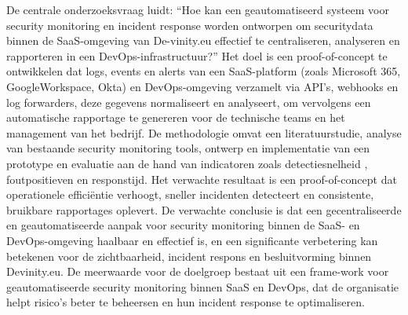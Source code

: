 \documentclass[dutch,dit,thesis]{hogentreport}
\begin{document}
De centrale onderzoeksvraag luidt: “Hoe kan een geautomatiseerd systeem voor security monitoring en incident response worden ontworpen om securitydata binnen de SaaS-omgeving van De-vinity.eu effectief te centraliseren, analyseren en rapporteren in een DevOps-infrastructuur?” Het doel is een proof-of-concept te ontwikkelen dat logs, events en alerts van een SaaS-platform (zoals Microsoft 365, GoogleWorkspace, Okta) en DevOps-omgeving verzamelt via API’s, webhooks en log forwarders, deze gegevens normaliseert en analyseert, om vervolgens een automatische rapportage te genereren voor de technische teams en het management van het bedrijf. De methodologie omvat een literatuurstudie, analyse van bestaande security monitoring tools, ontwerp en implementatie van een prototype en evaluatie aan de hand van indicatoren zoals detectiesnelheid , foutpositieven en responstijd. Het verwachte resultaat is een proof-of-concept dat operationele efficiëntie verhoogt, sneller incidenten detecteert en consistente, bruikbare rapportages oplevert. De verwachte conclusie is dat een gecentraliseerde en geautomatiseerde aanpak voor security monitoring binnen de SaaS- en DevOps-omgeving haalbaar en effectief is, en een significante verbetering kan betekenen voor de zichtbaarheid, incident respons en besluitvorming binnen Devinity.eu. De meerwaarde voor de doelgroep bestaat uit een frame-work voor geautomatiseerde security monitoring binnen SaaS en DevOps, dat de organisatie helpt risico’s beter te beheersen en hun incident response te optimaliseren. 



%


\backmatter{}

\setlength\bibitemsep{3pt} %
\printbibliography[heading=bibintoc]
\end{document}
